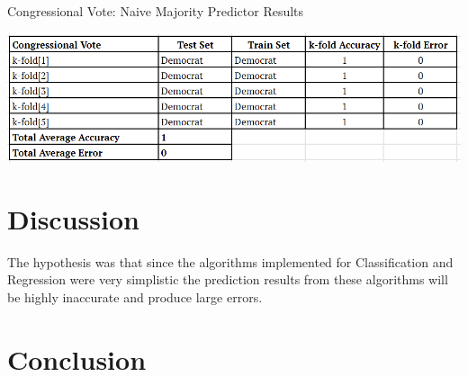 \documentclass[twoside,11pt]{article}
\begin{document}
\begin{table}[h!]
	\begin{center}
		\caption{Congressional Vote: Naive Majority Predictor Results}
		\label{tab:table3}
		\includegraphics[scale=.6]{CV_Results}\newline
	\end{center}
\end{table}



\newpage

\section{Discussion}
The hypothesis was that since the algorithms implemented for Classification and Regression were very simplistic the prediction results from these algorithms will be highly inaccurate and produce large errors.

\newpage

\section{Conclusion}

\newpage



\vskip 0.2in

\end{document}
